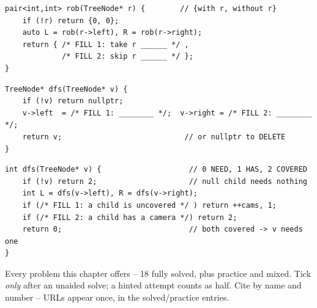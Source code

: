 \begin{lstlisting}[caption={Drill 3 -- two-channel bottom-up (from \coderef{c02-rob})}]
pair<int,int> rob(TreeNode* r) {        // {with r, without r}
    if (!r) return {0, 0};
    auto L = rob(r->left), R = rob(r->right);
    return { /* FILL 1: take r ______ */ ,
             /* FILL 2: skip r ______ */ };
}
\end{lstlisting}

\begin{lstlisting}[caption={Drill 4 -- return-new-root transform (from \coderef{c02-transform-skeleton})}]
TreeNode* dfs(TreeNode* v) {
    if (!v) return nullptr;
    v->left  = /* FILL 1: ________ */;  v->right = /* FILL 2: ________ */;
    return v;                            // or nullptr to DELETE
}
\end{lstlisting}

\begin{lstlisting}[caption={Drill 5 -- the Summit's three states (from \probref{c02-cameras})}]
int dfs(TreeNode* v) {                    // 0 NEED, 1 HAS, 2 COVERED
    if (!v) return 2;                     // null child needs nothing
    int L = dfs(v->left), R = dfs(v->right);
    if (/* FILL 1: a child is uncovered */ ) return ++cams, 1;
    if (/* FILL 2: a child has a camera */) return 2;
    return 0;                             // both covered -> v needs one
}
\end{lstlisting}


Every problem this chapter offers -- 18 fully solved, plus practice and mixed.
Tick \emph{only} after an unaided solve; a hinted attempt counts as half. Cite by
name and number -- URLs appear once, in the solved/practice entries.

